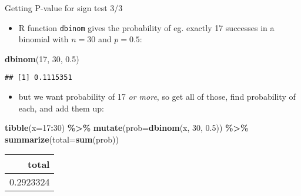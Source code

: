 \documentclass[
  ignorenonframetext,
]{beamer}
\newenvironment{Shaded}{\begin{snugshade}}{\end{snugshade}}
\newcommand{\DataTypeTok}[1]{\textcolor[rgb]{0.13,0.29,0.53}{#1}}
\newcommand{\DecValTok}[1]{\textcolor[rgb]{0.00,0.00,0.81}{#1}}
\newcommand{\FloatTok}[1]{\textcolor[rgb]{0.00,0.00,0.81}{#1}}
\newcommand{\KeywordTok}[1]{\textcolor[rgb]{0.13,0.29,0.53}{\textbf{#1}}}
\newcommand{\NormalTok}[1]{#1}
\newcommand{\OperatorTok}[1]{\textcolor[rgb]{0.81,0.36,0.00}{\textbf{#1}}}
\newcommand{\StringTok}[1]{\textcolor[rgb]{0.31,0.60,0.02}{#1}}
\providecommand{\tightlist}{%
  \setlength{\itemsep}{0pt}\setlength{\parskip}{0pt}}
\begin{document}
\begin{frame}[fragile]{Getting P-value for sign test 3/3}
\protect\hypertarget{getting-p-value-for-sign-test-33}{}
\begin{itemize}
\tightlist
\item
  R function \texttt{dbinom} gives the probability of eg. exactly 17
  successes in a binomial with \(n = 30\) and \(p = 0.5\):
\end{itemize}

\begin{Shaded}
\begin{Highlighting}[]
\KeywordTok{dbinom}\NormalTok{(}\DecValTok{17}\NormalTok{, }\DecValTok{30}\NormalTok{, }\FloatTok{0.5}\NormalTok{)}
\end{Highlighting}
\end{Shaded}

\begin{verbatim}
## [1] 0.1115351
\end{verbatim}

\begin{itemize}
\tightlist
\item
  but we want probability of 17 \emph{or more}, so get all of those,
  find probability of each, and add them up:
\end{itemize}

\begin{Shaded}
\begin{Highlighting}[]
\KeywordTok{tibble}\NormalTok{(}\DataTypeTok{x=}\DecValTok{17}\OperatorTok{:}\DecValTok{30}\NormalTok{) }\OperatorTok{\%\textgreater{}\%}\StringTok{ }
\StringTok{  }\KeywordTok{mutate}\NormalTok{(}\DataTypeTok{prob=}\KeywordTok{dbinom}\NormalTok{(x, }\DecValTok{30}\NormalTok{, }\FloatTok{0.5}\NormalTok{)) }\OperatorTok{\%\textgreater{}\%}\StringTok{ }
\StringTok{  }\KeywordTok{summarize}\NormalTok{(}\DataTypeTok{total=}\KeywordTok{sum}\NormalTok{(prob))}
\end{Highlighting}
\end{Shaded}

\begin{longtable}[]{@{}r@{}}
\toprule
total\tabularnewline
\midrule
\endhead
0.2923324\tabularnewline
\bottomrule
\end{longtable}
\end{frame}
\end{document}
